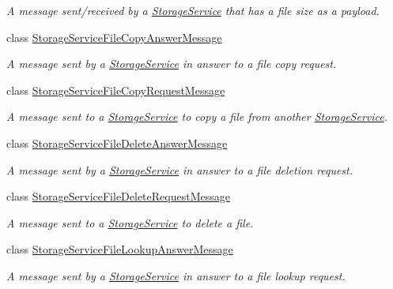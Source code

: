 \begin{DoxyCompactItemize}
\begin{DoxyCompactList}\small\item\em A message sent/received by a \hyperlink{classwrench_1_1_storage_service}{Storage\+Service} that has a file size as a payload. \end{DoxyCompactList}\item 
class \hyperlink{classwrench_1_1_storage_service_file_copy_answer_message}{Storage\+Service\+File\+Copy\+Answer\+Message}
\begin{DoxyCompactList}\small\item\em A message sent by a \hyperlink{classwrench_1_1_storage_service}{Storage\+Service} in answer to a file copy request. \end{DoxyCompactList}\item 
class \hyperlink{classwrench_1_1_storage_service_file_copy_request_message}{Storage\+Service\+File\+Copy\+Request\+Message}
\begin{DoxyCompactList}\small\item\em A message sent to a \hyperlink{classwrench_1_1_storage_service}{Storage\+Service} to copy a file from another \hyperlink{classwrench_1_1_storage_service}{Storage\+Service}. \end{DoxyCompactList}\item 
class \hyperlink{classwrench_1_1_storage_service_file_delete_answer_message}{Storage\+Service\+File\+Delete\+Answer\+Message}
\begin{DoxyCompactList}\small\item\em A message sent by a \hyperlink{classwrench_1_1_storage_service}{Storage\+Service} in answer to a file deletion request. \end{DoxyCompactList}\item 
class \hyperlink{classwrench_1_1_storage_service_file_delete_request_message}{Storage\+Service\+File\+Delete\+Request\+Message}
\begin{DoxyCompactList}\small\item\em A message sent to a \hyperlink{classwrench_1_1_storage_service}{Storage\+Service} to delete a file. \end{DoxyCompactList}\item 
class \hyperlink{classwrench_1_1_storage_service_file_lookup_answer_message}{Storage\+Service\+File\+Lookup\+Answer\+Message}
\begin{DoxyCompactList}\small\item\em A message sent by a \hyperlink{classwrench_1_1_storage_service}{Storage\+Service} in answer to a file lookup request. \end{DoxyCompactList}\item 

\end{DoxyCompactItemize}
